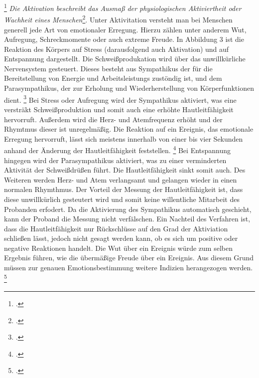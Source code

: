 \footcitetext[][S. 200]{Dil13}
\newline
\glqq \textit{Die Aktivation beschreibt das Ausmaß der physiologischen Aktiviertheit oder Wachheit eines Menschen}\grqq{}\footcite[][S. 28]{Die06}. Unter Aktivitation versteht man bei Menschen generell jede Art von emotionaler Erregung. Hierzu zählen unter anderem Wut, Aufregung, Schreckmomente oder auch extreme Freude. In Abbildung 3 ist die Reaktion des Körpers auf Stress (darausfolgend auch Aktivation) und auf Entspannung dargestellt. Die Schweißprodukation wird über das unwillkürliche Nervensystem gesteuert. Dieses besteht aus Sympathikus der für die Bereitstellung von Energie und Arbeitsleistungs zustöndig ist, und dem Parasympathikus, der zur Erholung und Wiederherstellung von Körperfunktionen dient. \footcite[Vgl. ][S. 5]{Lie13} \newline Bei Stress oder Aufregung wird der Sympathikus aktiviert, was eine versträkt Schweißproduktion und somit auch eine erhöhte Hautleitfähigkeit hervorruft. Außerdem wird die Herz- und Atemfrequenz erhöht und der Rhymtmus dieser ist unregelmäßig. Die Reaktion auf ein Ereignis, das emotionale Erregung hervorruft, lässt sich meistens innerhalb von einer bis vier Sekunden anhand der Änderung der Hautleitfähigkeit feststellen. \footcite[Vgl.][S. 130f]{Sch14} \newline 
Bei Entspannung hingegen wird der Parasympathikus aktiviert, was zu einer verminderten Aktivität der Schweißdrüßen führt. Die Hautleitfähigkeit sinkt somit auch. Des Weiteren werden Herz- und Atem verlangsamt und gelangen wieder in einen normalen Rhymthmus. \newline
Der Vorteil der Messung der Hautleitfähigkeit ist, dass diese unwillkürlich gesteutert wird und somit keine willentliche Mitarbeit des Probanden erfodert. Da die Aktivierung des Sympathikus automatisch geschieht, kann der Proband die Messung nicht verfälschen. \newline
Ein Nachteil des Verfahren ist, dass die Hautleitfähigkeit nur Rückschlüsse auf den Grad der Aktiviation schließen lässt, jedoch nicht gesagt werden kann, ob es sich um positive oder negative Reaktionen handelt. Die Wut über ein Ereignis würde zum selben Ergebnis führen, wie die übermäßige Freude über ein Ereignis. Aus diesem Grund müssen zur genauen Emotionsbestimmung weitere Indizien herangezogen werden. \footcite[Vgl. ][S.77]{Moe07}

